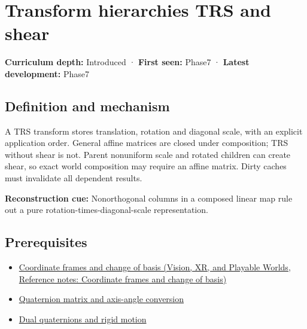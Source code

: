 \hypertarget{appendix-292c061cd47c}{}\label{referencestart:appendix-292c061cd47c}
\section{Transform hierarchies TRS and shear}\label{appendix-292c061cd47c-transform-hierarchies-trs-and-shear}

\hypertarget{appendix-292c061cd47c-transform-hierarchies-trs-and-shear}{}

\textbf{Curriculum depth:} Introduced · \textbf{First seen:} Phase7 · \textbf{Latest development:} Phase7

\begin{allmightroledefinition}

\subsection{Definition and mechanism}\label{appendix-292c061cd47c-definition-and-mechanism}

\hypertarget{appendix-292c061cd47c-definition-and-mechanism}{}

A TRS transform stores translation, rotation and diagonal scale, with an explicit application order. General affine matrices are closed under composition; TRS without shear is not. Parent nonuniform scale and rotated children can create shear, so exact world composition may require an affine matrix. Dirty caches must invalidate all dependent results.

\end{allmightroledefinition}

\textbf{Reconstruction cue:} Nonorthogonal columns in a composed linear map rule out a pure rotation-times-diagonal-scale representation.

\subsection{Prerequisites}\label{appendix-292c061cd47c-prerequisites}

\hypertarget{appendix-292c061cd47c-prerequisites}{}

\begin{itemize}
\tightlist
\item
  \href{../07-Vision-XR-and-Playable-Worlds/main.pdf\#nameddest=appendix-1bae9457dbc3}{Coordinate frames and change of basis (Vision, XR, and Playable Worlds, Reference notes: Coordinate frames and change of basis)}
\item
  \hyperref[appendix-26d8da71f6c4]{Quaternion matrix and axis-angle conversion}
\item
  \hyperref[appendix-d1ea57347893]{Dual quaternions and rigid motion}
\end{itemize}

